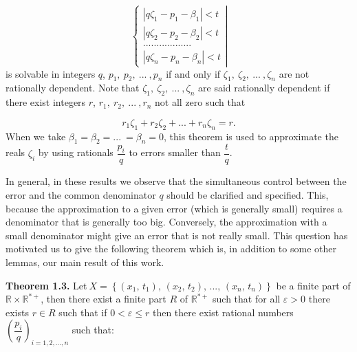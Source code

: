 \documentclass[12pt]{article}
\begin{document}
\begin{equation}
\left\{ 
\begin{array}{c}
\left\vert q\zeta _{1}-p_{1}-\beta _{1}\right\vert <t \\ 
\left\vert q\zeta _{2}-p_{2}-\beta _{2}\right\vert <t \\ 
.................. \\ 
\left\vert q\zeta _{n}-p_{n}-\beta _{n}\right\vert <t%
\end{array}%
\right\vert  \tag{1.2}
\end{equation}%
is solvable in integers $q$, $p_{1}\mathit{,\ }p_{2}\mathit{,\ }...\mathit{\
,}p_{n}$ if and only if $\zeta _{1}\mathit{,\ }\zeta _{2}\mathit{,\ }...%
\mathit{\ ,}\zeta _{n}$ are not rationally dependent. Note that $\zeta _{1}%
\mathit{,\ }\zeta _{2}\mathit{,\ }...\mathit{\ ,}\zeta _{n}$ are said
rationally dependent if there exist integers $r$, $r_{1}\mathit{,\ }r_{2}%
\mathit{,\ }...\mathit{\ ,}r_{n}$ not all zero such that

\begin{equation*}
r_{1}\zeta _{1}+r_{2}\zeta _{2}+...+r_{n}\zeta _{n}=r\text{.}
\end{equation*}%
When we take $\beta _{1}=\beta _{2}=...\mathit{\ }=\beta _{n}=0$, this
theorem is used to approximate the reals $\zeta _{i}$ by using rationals $%
\dfrac{p_{i}}{q}$ to errors smaller than $\dfrac{t}{q}$.

In general, in these results we observe that the simultaneous control
between the error and the common denominator $q$ should be clarified and
specified. This, because the approximation to a given error (which is
generally small) requires a denominator that is generally too big.
Conversely, the approximation with a small denominator might give an error
that is not really small. This question has motivated us to give the
following theorem which is, in addition to some other lemmas, our main
result of this work.\newline

\noindent \textbf{Theorem 1.3.} Let$\ X=\left\{ \left( x_{1}\text{, }%
t_{1}\right) \text{, }\left( x_{2}\text{, }t_{2}\right) \text{, ..., }\left(
x_{n}\text{, }t_{n}\right) \right\} $ be a finite part of $\mathbb{R}\times 
\mathbb{R}^{\ast +}$, then there exist a finite part $R$ of $\mathbb{R}%
^{\ast +}$ such that for all $\varepsilon >0$ there exists $r\in R$ such
that if $0<\varepsilon \leq r$ then there exist rational numbers $\left( 
\dfrac{p_{i}}{q}\right) _{i=1,2,...,n}$ such that:
\end{document}
